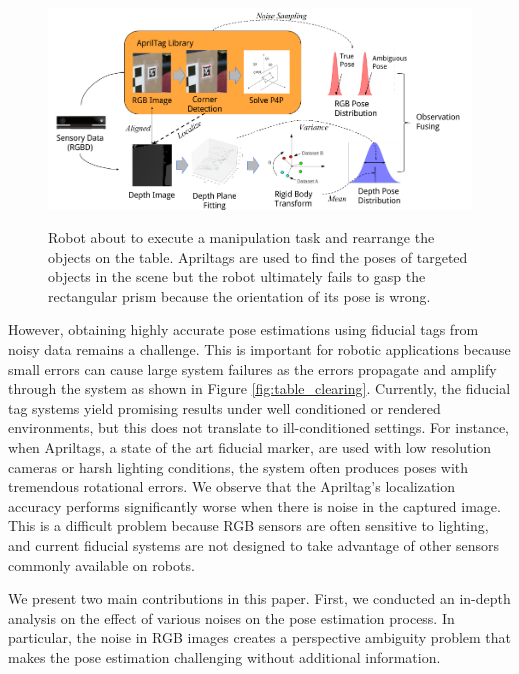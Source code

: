 \begin{figure}
\includegraphics[width=\columnwidth]{figs/pipeline} \\
\caption{Robot about to execute a manipulation task and rearrange the objects on the table. Apriltags are used to find the poses of targeted objects in the scene but the robot ultimately fails to gasp the rectangular prism because the orientation of its pose is wrong.}
\label{fig:pipeline}
\end{figure}

However, obtaining highly accurate pose estimations using fiducial tags from noisy data remains a challenge. This is  important for robotic applications because small errors can cause large system failures as the errors propagate and amplify through the system as shown in Figure \ref{fig:table_clearing}. Currently, the fiducial tag systems yield promising results under well conditioned or rendered environments, but this does not translate to ill-conditioned settings. For instance, when Apriltags, a state of the art fiducial marker, are used with low resolution cameras or harsh lighting conditions, the system often produces poses with tremendous rotational errors. We observe that the Apriltag's localization accuracy performs significantly worse when there is noise in the captured image. This is a difficult problem because RGB sensors are often sensitive to lighting, and current fiducial systems are not designed to take advantage of other sensors commonly available on robots.

We present two main contributions in this paper. First, we conducted an in-depth analysis on the effect of various noises on the pose estimation process. In particular, the noise in RGB images creates a perspective ambiguity problem that makes the pose estimation challenging without additional information. 

